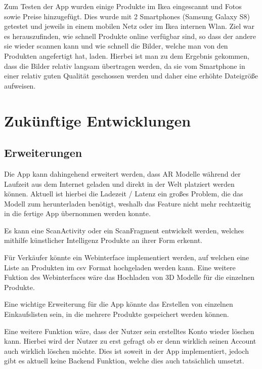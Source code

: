 \documentclass{scrartcl}
\begin{document}
Zum Testen der App wurden einige Produkte im Ikea eingescannt und Fotos sowie Preise hinzugefügt. Dies wurde mit 2 Smartphones (Samsung Galaxy S8) getestet und jeweils in einem mobilen Netz oder im Ikea internen Wlan. Ziel war es herauszufinden, wie schnell Produkte online verfügbar sind, so dass der andere sie wieder scannen kann und wie schnell die Bilder, welche man von den Produkten angefertigt hat, laden. Hierbei ist man zu dem Ergebnis gekommen, dass die Bilder relativ langsam übertragen werden, da sie vom Smartphone in einer relativ guten Qualität geschossen werden und daher eine erhöhte Dateigröße aufweisen.

\newpage

\section{Zukünftige Entwicklungen}

\subsection{Erweiterungen}

\noindent Die App kann dahingehend erweitert werden, dass AR Modelle während der Laufzeit aus dem Internet geladen und direkt in der Welt platziert werden können. Aktuell ist hierbei die Ladezeit / Latenz ein großes Problem, die das Modell zum herunterladen benötigt, weshalb das Feature nicht mehr rechtzeitig in die fertige App übernommen werden konnte. \newline 

\noindent Es kann eine ScanActivity oder ein ScanFragment entwickelt werden, welches mithilfe künstlicher Intelligenz Produkte an ihrer Form erkennt. \newline 

\noindent Für Verkäufer könnte ein Webinterface implementiert werden, auf welchen eine Liste an Produkten im csv Format hochgeladen werden kann. Eine weitere Fuktion des Webinterfaces wäre das Hochladen von 3D Modelle für die einzelnen Produkte. \newline

\noindent Eine wichtige Erweiterung für die App könnte das Erstellen von einzelnen Einkaufslisten sein, in die mehrere Produkte gespeichert werden können. \newline 

\noindent Eine weitere Funktion wäre, dass der Nutzer sein erstelltes Konto wieder löschen kann. Hierbei wird der Nutzer zu erst gefragt ob er denn wirklich seinen Account auch wirklich löschen möchte. Dies ist soweit in der App implementiert, jedoch gibt es aktuell keine Backend Funktion, welche dies auch tatsächlich umsetzt. \newline 
\end{document}
